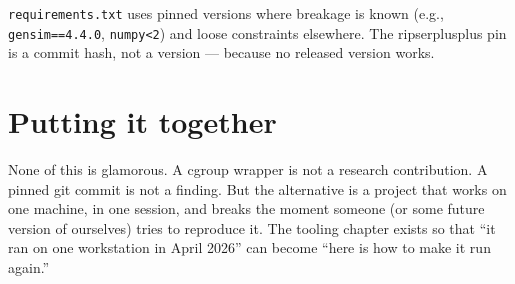 \texttt{requirements.txt} uses pinned versions where breakage is known (e.g., \texttt{gensim==4.4.0}, \texttt{numpy<2}) and loose constraints elsewhere. The ripserplusplus pin is a commit hash, not a version --- because no released version works.

\section{Putting it together}

None of this is glamorous. A cgroup wrapper is not a research contribution. A pinned git commit is not a finding. But the alternative is a project that works on one machine, in one session, and breaks the moment someone (or some future version of ourselves) tries to reproduce it. The tooling chapter exists so that ``it ran on one workstation in April 2026'' can become ``here is how to make it run again.''
